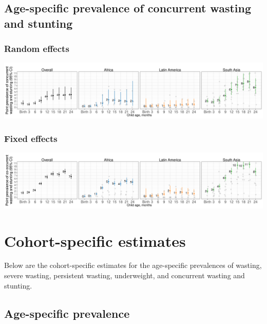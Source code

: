 \documentclass[
  9pt,
]{book}
\begin{document}
\hypertarget{age-specific-prevalence-of-concurrent-wasting-and-stunting}{%
\section{Age-specific prevalence of concurrent wasting and stunting}\label{age-specific-prevalence-of-concurrent-wasting-and-stunting}}

\hypertarget{random-effects-6}{%
\subsection{Random effects}\label{random-effects-6}}

\includegraphics[width=58.33in]{figures/wasting/fig-wast-2-co-overall_region--allage-primary}

\hypertarget{fixed-effects-7}{%
\subsection{Fixed effects}\label{fixed-effects-7}}

\includegraphics[width=58.33in]{figures/wasting/FE/fig-wast-2-co-overall_region--allage-primary_FE}

\hypertarget{cohort}{%
\chapter{Cohort-specific estimates}\label{cohort}}

\raggedright

Below are the cohort-specific estimates for the age-specific prevalences of wasting, severe wasting, persistent wasting, underweight, and concurrent wasting and stunting.

\hypertarget{age-specific-prevalence-1}{%
\section{Age-specific prevalence}\label{age-specific-prevalence-1}}
\end{document}
